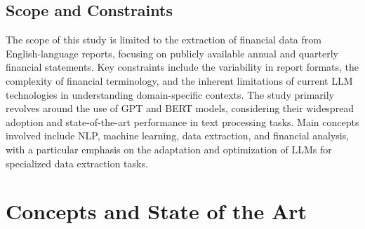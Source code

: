 \documentclass[english, 12pt, a4paper, elec, utf8, a-2b, online]{aaltothesis}
\begin{document}
\subsection{Scope and Constraints}

The scope of this study is limited to the extraction of financial data from English-language reports, focusing on publicly available annual and quarterly financial statements. Key constraints include the variability in report formats, the complexity of financial terminology, and the inherent limitations of current LLM technologies in understanding domain-specific contexts. The study primarily revolves around the use of GPT and BERT models, considering their widespread adoption and state-of-the-art performance in text processing tasks. Main concepts involved include \ac{NLP}, machine learning, data extraction, and financial analysis, with a particular emphasis on the adaptation and optimization of LLMs for specialized data extraction tasks.

\clearpage

\section{Concepts and State of the Art}
\end{document}
